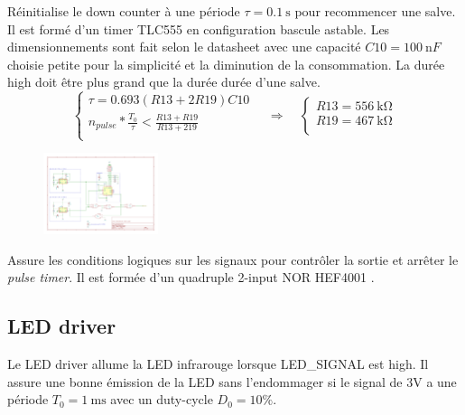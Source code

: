 \documentclass[french]{layout/Report}
\begin{document}
\begin{description}[leftmargin=!,labelwidth=3cm, labelindent=\parindent]
	\item[Burst timer]
        Réinitialise le down counter à une période $\tau = \SI{0.1}{\second}$ pour recommencer une salve.
        Il est formé d'un timer TLC555 en configuration bascule astable.
        Les dimensionnements sont fait selon le datasheet \cite{TLC555} avec une capacité $\mathit{C10} = \SI{100}{\nano F}$ choisie petite pour la simplicité et la diminution de la consommation.
        La durée high doit être plus grand que la durée durée d'une salve.
		\begin{equation*}
			\begin{cases}
				\tau = 0.693(\mathit{R13}+2\mathit{R19})\mathit{C10} \\
				n_{pulse}*\frac{T_0}{\tau} < \frac{\mathit{R13}+\mathit{R19}}{\mathit{R13}+2\mathit{19}} \\
			\end{cases}
		\quad\Rightarrow\quad
			\begin{cases}
				\mathit{R13} = \SI{556}{\kilo\ohm} \\
				\mathit{R19} = \SI{467}{\kilo\ohm} \\
			\end{cases}
		\end{equation*}

        \begin{figure}[H]
        \centering
        \includegraphics[width=0.3\textwidth]{fig/burst_timer.pdf}
        \end{figure}

	\item[Logic]
        Assure les conditions logiques sur les signaux pour contrôler la sortie et arrêter le \textit{pulse timer}.
        Il est formée d'un quadruple 2-input NOR HEF4001 \cite{HEF4001B}.
\end{description}

\subsection{LED driver}
\label{subsec:LED_driver}
Le LED driver allume la LED infrarouge lorsque LED\_SIGNAL est high. Il assure une bonne émission de la LED sans l'endommager si le signal de 3V a une période $T_0 = \SI{1}{\milli\second}$ avec un duty-cycle $D_0 = 10\%$.
\end{document}
